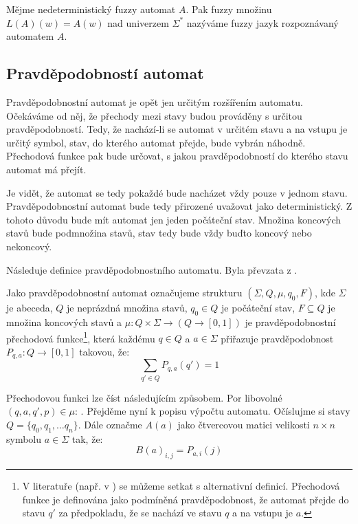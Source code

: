 \documentclass[a4paper,10pt]{article}
\begin{document}
\begin{definition}\label{def-JazRozpAut}
 Mějme nedeterministický fuzzy automat $A$. Pak fuzzy množinu $L(A)(w) = A(w)$ nad univerzem $\Sigma^*$ nazýváme fuzzy jazyk rozpoznávaný automatem $A$.
\end{definition}


\subsection{Pravděpodobností automat}

Pravděpodobnostní automat je opět jen určitým rozšířením  automatu. Očekáváme od něj, že přechody mezi stavy budou prováděny s určitou pravděpodobností. Tedy, že nachází-li se automat v určitém stavu a na vstupu je určitý symbol, stav, do kterého automat přejde, bude vybrán náhodně. Přechodová funkce pak bude určovat, s jakou pravděpodobností do kterého stavu automat má přejít.

Je vidět, že automat se tedy pokaždé bude nacházet vždy pouze v jednom stavu. Pravděpodobnostní automat bude tedy přirozené uvažovat jako deterministický. Z tohoto důvodu bude mít automat jen jeden počáteční stav. Množina koncových stavů bude  podmnožina stavů, stav tedy bude vždy buďto koncový nebo nekoncový.

Následuje definice pravděpodobnostního automatu. Byla převzata z \cite{Rab-ProbAut}.
\begin{definition}
 Jako pravděpodobnostní automat označujeme strukturu $(\Sigma, Q, \mu, q_0, F)$, kde $\Sigma$ je abeceda, $Q$ je neprázdná množina stavů, $q_0 \in Q$ je počáteční stav, $F \subseteq Q$ je množina koncových stavů a $\mu: Q \times \Sigma \rightarrow (Q \rightarrow [0,1])$ je pravděpodobnostní přechodová funkce\footnote{V literatuře (např. v \cite{San-ReaFuzLanProMaxMaxAut}) se můžeme setkat s alternativní definicí. Přechodová funkce je definována jako podmíněná pravděpodobnost, že automat přejde do stavu $q'$ za předpokladu, že se nachází ve stavu $q$ a na vstupu je $a$.}, která každému $q \in Q$ a $a \in \Sigma$ přiřazuje pravděpodobnost $P_{q,a}: Q \rightarrow [0,1]$ takovou, že:
 $$   
  \sum_{q' \in Q} P_{q, a}(q') = 1 
 $$
\end{definition}

Přechodovou funkci lze číst následujícím způsobem. Por libovolné $(q, a, q', p) \in \mu$: . Přejděme nyní k popisu výpočtu automatu. Očíslujme si stavy $Q = \{ q_0, q_1, \dots q_n \}$. Dále označme $A(a)$ jako čtvercovou matici velikosti $n \times n$ symbolu $a \in \Sigma$ tak, že:
$$
  B(a)_{i, j} = P_{a,i}(j)
$$
\end{document}
